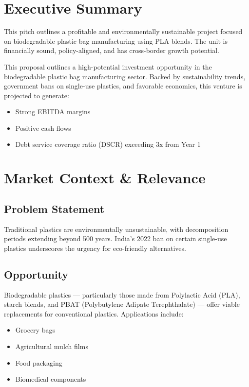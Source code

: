\section{Executive Summary}

This pitch outlines a profitable and environmentally sustainable project focused on biodegradable plastic bag manufacturing using PLA blends. The unit is financially sound, policy-aligned, and has cross-border growth potential.

This proposal outlines a high-potential investment opportunity in the biodegradable plastic bag manufacturing sector. Backed by sustainability trends, government bans on single-use plastics, and favorable economics, this venture is projected to generate:

\begin{itemize}[label=\textcolor{green}{\checkmark}]
    \item Strong EBITDA margins
    \item Positive cash flows
    \item Debt service coverage ratio (DSCR) exceeding 3x from Year 1
\end{itemize}

\vspace{0.5cm}

\section{Market Context \& Relevance}

\subsection{Problem Statement}

Traditional plastics are environmentally unsustainable, with decomposition periods extending beyond 500 years. India's 2022 ban on certain single-use plastics underscores the urgency for eco-friendly alternatives.

\subsection{Opportunity}

Biodegradable plastics — particularly those made from Polylactic Acid (PLA), starch blends, and PBAT (Polybutylene Adipate Terephthalate) — offer viable replacements for conventional plastics. Applications include:

\begin{itemize}
    \item Grocery bags
    \item Agricultural mulch films
    \item Food packaging
    \item Biomedical components
\end{itemize}

